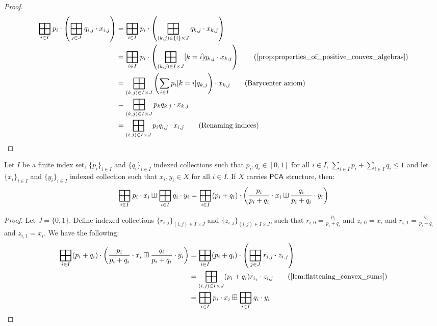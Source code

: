 \begin{proof}
    \begin{align*}
        \bigboxplus_{i \in I} p_i \cdot \left(\bigboxplus_{j \in J} q_{i,j} \cdot x_{i,j}\right) &= \bigboxplus_{i \in I} p_i \cdot \left(\bigboxplus_{(k,j) \in \{i\} \times J} q_{k,j} \cdot x_{k,j}\right) \\
        &= \bigboxplus_{i \in I} p_i \cdot \left(\bigboxplus_{(k,j) \in I \times J} [k = i]q_{k,j} \cdot x_{k,j}\right) \tag{\cref{prop:properties_of_positive_convex_algebras}} \\
        &= \bigboxplus_{(k,j) \in I \times J} \left(\sum_{i \in I} p_i [k=i]q_{k,j} \right) \cdot x_{k,j} \tag{Barycenter axiom} \\
        &= \bigboxplus_{(k,j) \in I \times J} p_k q_{k,j}  \cdot x_{k,j} \\
        &= \bigboxplus_{(i,j) \in I \times J} p_i q_{i,j}  \cdot x_{i,j} \tag{Renaming indices}\\
    \end{align*}
\end{proof}
\begin{lemma}\label{c4:lem:grouping_probabilities}
    Let $I$ be a finite index set, $\{p_i\}_{i \in I}$ and $\{q_i\}_{i \in I}$ indexed collections such that $p_i,q_i \in [0,1]$ for all $i \in I$, $\sum_{i \in I} p_i + \sum_{i \in I} q_i \leq 1$ and let $\{x_i\}_{i \in I}$ and $\{y_i\}_{i \in I}$ indexed collection such that $x_i, y_i \in X$ for all $i \in I$. If $X$ carries ${\mathsf{PCA}}$ structure, then:
    $$
    \bigboxplus_{i \in I} p_i \cdot x_i \boxplus\bigboxplus_{i \in I} q_i \cdot y_i = \bigboxplus_{i \in I} (p_i + q_i) \cdot \left(\frac{p_i}{p_i + q_i} \cdot x_i \boxplus \frac{q_i}{p_i + q_i} \cdot y_i \right)
    $$
\end{lemma}
\begin{proof}
    Let $J = \{0,1\}$. Define indexed collections $\{r_{i,j}\}_{(i,j) \in I \times J}$ and $\{z_{i,j}\}_{(i,j) \in I \times J}$, such that $r_{i,0} = \frac{p_i}{p_i + q_i}$ and $z_{i,0} = x_i$ and $r_{i,1} = \frac{q_i}{p_i + q_i}$ and $z_{i,1} = x_i$.
    We have the following:
    \begin{align*}
        \bigboxplus_{i \in I} (p_i + q_i) \cdot \left(\frac{p_i}{p_i + q_i} \cdot x_i \boxplus \frac{q_i}{p_i + q_i} \cdot y_i\right) &= \bigboxplus_{i \in I} (p_i + q_i) \cdot \left(\bigboxplus_{j \in J} r_{i,j} \cdot z_{i,j} \right) \\
        &= \bigboxplus_{(i,j) \in I \times J} (p_i + q_i)r_{i_j} \cdot z_{i,j} \tag{\cref{lem:flattening_convex_sums}} \\
        &= \bigboxplus_{i \in I} p_i \cdot x_{i} \boxplus \bigboxplus_{i \in I} q_i \cdot y_i
    \end{align*}
\end{proof}
